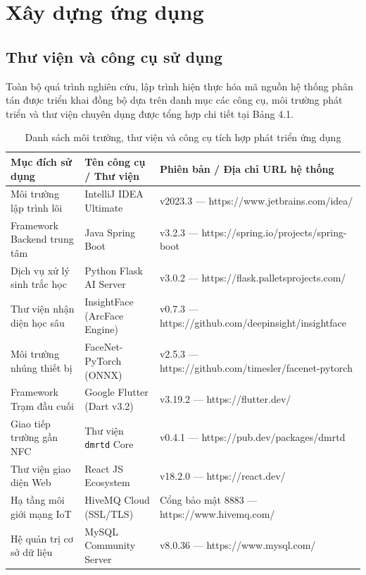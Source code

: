 ﻿\documentclass[../DoAn.tex]{subfiles}
\begin{document}
\section{Xây dựng ứng dụng}
\label{section:4.3}

\subsection{Thư viện và công cụ sử dụng}

Toàn bộ quá trình nghiên cứu, lập trình hiện thực hóa mã nguồn hệ thống phân tán được triển khai đồng bộ dựa trên danh mục các công cụ, môi trường phát triển và thư viện chuyên dụng được tổng hợp chi tiết tại Bảng 4.1.

\begin{table}[tbhp]
\centering
\small
\renewcommand{\arraystretch}{1.3}
\caption{Danh sách môi trường, thư viện và công cụ tích hợp phát triển ứng dụng}
\label{table:tools_development}
\begin{tabularx}{\linewidth}{|>{\raggedright\arraybackslash}p{3.2cm}|>{\raggedright\arraybackslash}p{4.2cm}|>{\raggedright\arraybackslash}X|}
\hline
\textbf{Mục đích sử dụng} & \textbf{Tên công cụ / Thư viện} & \textbf{Phiên bản / Địa chỉ URL hệ thống} \\
\hline
Môi trường lập trình lõi & IntelliJ IDEA Ultimate & v2023.3 — https://www.jetbrains.com/idea/ \\
\hline
Framework Backend trung tâm & Java Spring Boot & v3.2.3 — https://spring.io/projects/spring-boot \\
\hline
Dịch vụ xử lý sinh trắc học & Python Flask AI Server & v3.0.2 — https://flask.palletsprojects.com/ \\
\hline
Thư viện nhận diện học sâu & InsightFace (ArcFace Engine) & v0.7.3 — https://github.com/deepinsight/insightface \\
\hline
Môi trường nhúng thiết bị & FaceNet-PyTorch (ONNX) & v2.5.3 — https://github.com/timesler/facenet-pytorch \\
\hline
Framework Trạm đầu cuối & Google Flutter (Dart v3.2) & v3.19.2 — https://flutter.dev/ \\
\hline
Giao tiếp trường gần NFC & Thư viện \texttt{dmrtd} Core & v0.4.1 — https://pub.dev/packages/dmrtd \\
\hline
Thư viện giao diện Web & React JS Ecosystem & v18.2.0 — https://react.dev/ \\
\hline
Hạ tầng môi giới mạng IoT & HiveMQ Cloud (SSL/TLS) & Cổng bảo mật 8883 — https://www.hivemq.com/ \\
\hline
Hệ quản trị cơ sở dữ liệu & MySQL Community Server & v8.0.36 — https://www.mysql.com/ \\
\hline
\end{tabularx}
\end{table}
\end{document}

